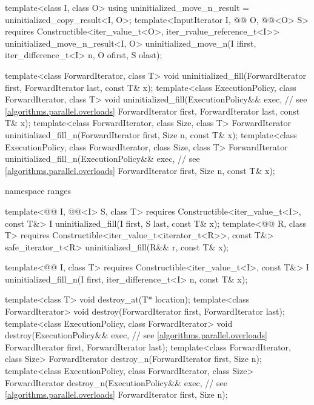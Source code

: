 \begin{codeblock}
{{    template<class I, class O>
      using uninitialized_move_n_result = uninitialized_copy_result<I, O>;
    template<InputIterator I,
             @@ O, @@<O> S>
      requires Constructible<iter_value_t<O>, iter_rvalue_reference_t<I>>
        uninitialized_move_n_result<I, O>
          uninitialized_move_n(I ifirst, iter_difference_t<I> n, O ofirst, S olast);
  }

  template<class ForwardIterator, class T>
    void uninitialized_fill(ForwardIterator first, ForwardIterator last, const T& x);
  template<class ExecutionPolicy, class ForwardIterator, class T>
    void uninitialized_fill(ExecutionPolicy&& exec, // see \ref{algorithms.parallel.overloads}
                            ForwardIterator first, ForwardIterator last, const T& x);
  template<class ForwardIterator, class Size, class T>
    ForwardIterator uninitialized_fill_n(ForwardIterator first, Size n, const T& x);
  template<class ExecutionPolicy, class ForwardIterator, class Size, class T>
    ForwardIterator uninitialized_fill_n(ExecutionPolicy&& exec, // see \ref{algorithms.parallel.overloads}
                                         ForwardIterator first, Size n, const T& x);

  namespace ranges {
    template<@@ I, @@<I> S, class T>
      requires Constructible<iter_value_t<I>, const T&>
        I uninitialized_fill(I first, S last, const T& x);
    template<@@ R, class T>
      requires Constructible<iter_value_t<iterator_t<R>>, const T&>
        safe_iterator_t<R> uninitialized_fill(R&& r, const T& x);

    template<@@ I, class T>
      requires Constructible<iter_value_t<I>, const T&>
        I uninitialized_fill_n(I first, iter_difference_t<I> n, const T& x);
  }

  template<class T>
    void destroy_at(T* location);
  template<class ForwardIterator>
    void destroy(ForwardIterator first, ForwardIterator last);
  template<class ExecutionPolicy, class ForwardIterator>
    void destroy(ExecutionPolicy&& exec, // see \ref{algorithms.parallel.overloads}
                 ForwardIterator first, ForwardIterator last);
  template<class ForwardIterator, class Size>
    ForwardIterator destroy_n(ForwardIterator first, Size n);
  template<class ExecutionPolicy, class ForwardIterator, class Size>
    ForwardIterator destroy_n(ExecutionPolicy&& exec, // see \ref{algorithms.parallel.overloads}
                              ForwardIterator first, Size n);

}
\end{codeblock}
